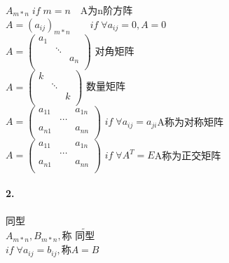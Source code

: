 \documentclass[printbox]{BHCexam}
\begin{document}
$A_{m*n}\;if\;m=n\quad $A为n阶方阵\\
$A=(a_{ij})_{m*n}\qquad if\;\forall a_{ij}=0,A=0$\\
$A=\left(                 %
\begin{array}{ccc}   %
  a_{1} &  &  \\  %
  & \ddots & \\  %
& & a_{n}\\ 
\end{array}
\right)$                 %
对角矩阵\\
$A=\left(                 %
\begin{array}{ccc}   %
  k &  &  \\  %
  & \ddots & \\  %
& & k\\ 
\end{array}
\right)$                 %
数量矩阵\\
$A=\left(                 %
\begin{array}{ccc}   %
  a_{11} &  & a_{1n} \\  %
  & \cdots & \\  %
a_{n1}& & a_{nn}\\ 
\end{array}
\right)$                 %
$if\;\forall a_{ij}=a_{ji}$\qquad A称为对称矩阵\\
$A=\left(                 %
\begin{array}{ccc}   %
  a_{11} &  & a_{1n} \\  %
  & \cdots & \\  %
a_{n1}& & a_{nn}\\ 
\end{array}
\right)$                 %
$if\;\forall A^{T}=E$\qquad A称为正交矩阵\\

\paragraph{2.}同型\\
$A_{m*n},B_{m*n},$称 $\widetilde{\text{同型}}$\\
$if\; \forall a_{ij}=b_{ij},$称$A=B$
\end{document}
